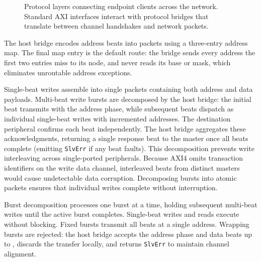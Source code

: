 \documentclass[journal,9pt]{IEEEtran}
\begin{document}
\begin{figure}[htbp]
\centering
{}
\caption{Protocol layers connecting endpoint clients across the network.
Standard AXI interfaces interact with protocol bridges that translate between
channel handshakes and network packets.}
\label{fig:n-layers}
\end{figure}

The host bridge encodes address beats into packets using a three-entry
address map. The final map entry is the default route: the bridge sends
every address the first two entries miss to its node, and never reads its
base or mask, which eliminates unroutable address exceptions.

Single-beat writes assemble into single packets containing both address and
data payloads. Multi-beat write bursts are decomposed by the host bridge:
the initial beat transmits with the address phase, while subsequent beats
dispatch as individual single-beat writes with incremented addresses. The
destination peripheral confirms each beat independently. The host bridge
aggregates these acknowledgments, returning a single response beat to the
master once all beats complete (emitting \texttt{SlvErr} if any beat faults).
This decomposition prevents write interleaving across single-ported
peripherals. Because AXI4 omits transaction identifiers on the write data
channel, interleaved beats from distinct masters would cause undetectable
data corruption. Decomposing bursts into atomic packets ensures that
individual writes complete without interruption.

Burst decomposition processes one burst at a time, holding subsequent
multi-beat writes until the active burst completes. Single-beat writes and
reads execute without blocking. Fixed bursts transmit all beats at a single
address. Wrapping bursts are rejected: the host bridge accepts the address
phase and data beats up to , discards the transfer locally, and
returns \texttt{SlvErr} to maintain channel alignment.
\end{document}
